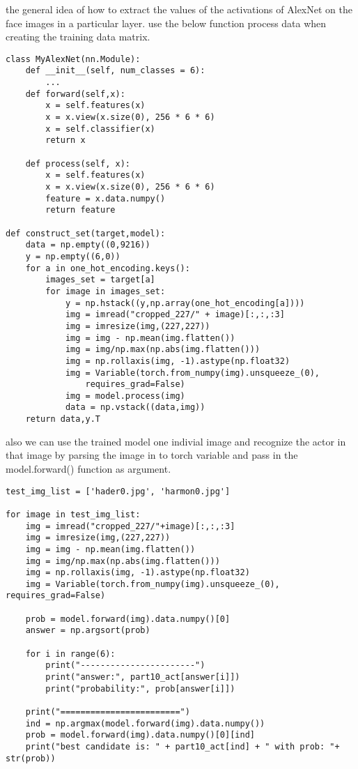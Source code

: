 \documentclass{article}
\begin{document}
\noindent the general idea of how to extract the values of the activations of AlexNet on the face images in a particular layer.
use the below function process data when creating the training data matrix.

\Large\begin{lstlisting}[basicstyle=\large\ttfamily]
class MyAlexNet(nn.Module):
    def __init__(self, num_classes = 6):
        ...
    def forward(self,x):
        x = self.features(x)
        x = x.view(x.size(0), 256 * 6 * 6)
        x = self.classifier(x)
        return x
        
    def process(self, x):
        x = self.features(x)
        x = x.view(x.size(0), 256 * 6 * 6)
        feature = x.data.numpy()
        return feature
    
def construct_set(target,model):
    data = np.empty((0,9216))
    y = np.empty((6,0))
    for a in one_hot_encoding.keys():
        images_set = target[a]
        for image in images_set:
            y = np.hstack((y,np.array(one_hot_encoding[a])))
            img = imread("cropped_227/" + image)[:,:,:3]
            img = imresize(img,(227,227))
            img = img - np.mean(img.flatten())
            img = img/np.max(np.abs(img.flatten()))
            img = np.rollaxis(img, -1).astype(np.float32)
            img = Variable(torch.from_numpy(img).unsqueeze_(0),
                requires_grad=False)
            img = model.process(img)
            data = np.vstack((data,img))
    return data,y.T
\end{lstlisting}
also we can use the trained model one indivial image and recognize the actor in that image by parsing the image in to torch variable and pass in the model.forward() function as argument. 
\Large\begin{lstlisting}[basicstyle=\large\ttfamily]
test_img_list = ['hader0.jpg', 'harmon0.jpg']

for image in test_img_list:
    img = imread("cropped_227/"+image)[:,:,:3]
    img = imresize(img,(227,227))
    img = img - np.mean(img.flatten())
    img = img/np.max(np.abs(img.flatten()))
    img = np.rollaxis(img, -1).astype(np.float32)
    img = Variable(torch.from_numpy(img).unsqueeze_(0), requires_grad=False)    
    
    prob = model.forward(img).data.numpy()[0]
    answer = np.argsort(prob)
    
    for i in range(6):
        print("-----------------------")
        print("answer:", part10_act[answer[i]])
        print("probability:", prob[answer[i]])

    print("========================")
    ind = np.argmax(model.forward(img).data.numpy())
    prob = model.forward(img).data.numpy()[0][ind]
    print("best candidate is: " + part10_act[ind] + " with prob: "+ str(prob))
\end{lstlisting}
\end{document}
